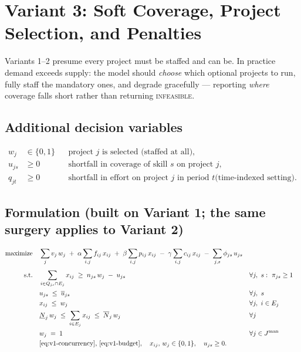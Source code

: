\documentclass[11pt]{article}
\newcommand{\B}{\{0,1\}}
\DeclareMathOperator*{\maximize}{maximize}
\theoremstyle{remark}
\begin{document}
\section{Variant 3: Soft Coverage, Project Selection, and Penalties}

Variants 1--2 presume every project must be staffed and can be. In
practice demand exceeds supply: the model should \emph{choose} which
optional projects to run, fully staff the mandatory ones, and degrade
gracefully --- reporting \emph{where} coverage falls short rather than
returning \textsc{infeasible}.

\subsection{Additional decision variables}
\begin{align*}
w_j &\in \B && \text{project $j$ is selected (staffed at all)}, \\
u_{js} &\ge 0 && \text{shortfall in coverage of skill $s$ on project $j$}, \\
q_{jt} &\ge 0 && \text{shortfall in effort on project $j$ in period $t$
  \ (time-indexed setting)}.
\end{align*}

\subsection{Formulation (built on Variant 1; the same surgery applies to Variant 2)}

\begin{align}
\maximize \quad
  & \sum_{j} v_j\, w_j
  \;+\; \alpha \sum_{i,j} f_{ij}\, x_{ij}
  \;+\; \beta \sum_{i,j} p_{ij}\, x_{ij}
  \;-\; \gamma \sum_{i,j} c_{ij}\, x_{ij}
  \;-\; \sum_{j,s} \phi_{js}\, u_{js}
  \label{eq:v3-obj} \\[4pt]
\text{s.t.}\quad
  & \sum_{i \in Q_{js} \cap E_j} x_{ij} \;\ge\; n_{js}\, w_j \;-\; u_{js}
  && \forall j,\ s:\ \pi_{js} \ge 1
  \label{eq:v3-softcover} \\
  & u_{js} \;\le\; \overline{u}_{js}
  && \forall j,\ s
  \label{eq:v3-slackcap} \\
  & x_{ij} \;\le\; w_j
  && \forall j,\ i \in E_j
  \label{eq:v3-link} \\
  & \underline{N}_j\, w_j \;\le\; \sum_{i \in E_j} x_{ij}
    \;\le\; \overline{N}_j\, w_j
  && \forall j
  \label{eq:v3-teamsize} \\
  & w_j \;=\; 1
  && \forall j \in J^{\mathrm{man}}
  \label{eq:v3-mandatory} \\
  & \text{\eqref{eq:v1-concurrency}, \eqref{eq:v1-budget}},
  \quad x_{ij},\, w_j \in \B,\quad u_{js} \ge 0. \nonumber
\end{align}
\end{document}
